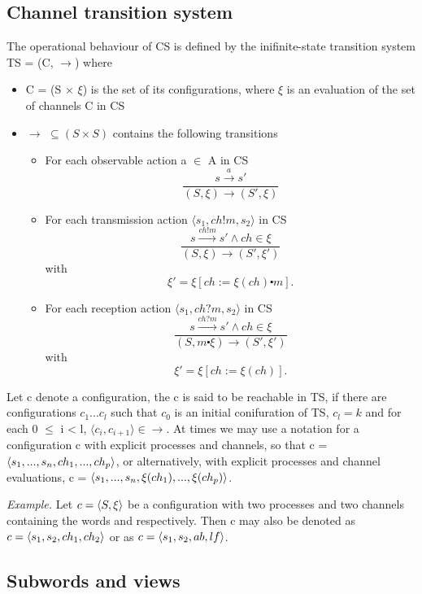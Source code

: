 \subsection{Channel transition system}
The operational behaviour of CS is defined by the inifinite-state transition system TS = (C, $\rightarrow$) where
\begin{itemize}
\item[]
   C = (S $\times$ $\xi$) is the set of its configurations, where $\xi$ is an evaluation of the set of channels C in CS
\item[]
  $\rightarrow$ $\subseteq (S \times S)$ contains the following transitions
  \begin{itemize}
    \item
      For each observable action a $\in$ A in CS
      \[
      \dfrac{s \xrightarrow{a} s'}{(S, \xi) \rightarrow (S', \xi)}
      \]
    \item
      For each transmission action $\langle s_1, ch!m, s_2 \rangle$ in CS
      \[
      \dfrac{s \xrightarrow{ch!m} s' \wedge ch \in \xi}{(S, \xi) \rightarrow (S', \xi')} \] with \[ \xi' = \xi[ch := \xi (ch) \centerdot m].
      \]
    \item
      For each reception action $\langle s_1, ch?m, s_2 \rangle$ in CS
      \[
      \dfrac{s \xrightarrow{ch?m} s' \wedge ch \in \xi}{(S, m \centerdot \xi) \rightarrow (S', \xi')} \] with \[ \xi' = \xi[ch:= \xi (ch)].
      \]

  \end{itemize}
\end{itemize}

Let c denote a configuration, the c is said to be reachable in TS, if there are configurations $c_1...c_l$ such that $c_0$ is an initial conifuration of TS, $c_l = k$ and for each 0 $\leq$ i < l, $\langle c_i, c_{i+1} \rangle \in \rightarrow$. At times we may use a notation for a configuration c with explicit processes and channels, so that c = $\langle s_1,...,s_n, ch_1,...,ch_p\rangle$, or alternatively, with explicit processes and channel evaluations, c = $\langle s_1,...,s_n, \xi(ch_1),...,\xi(ch_p)\rangle$.

\emph{Example.} Let $c = \langle S,\xi\rangle$ be a configuration with two processes and two channels containing the words  and  respectively. Then c may also be denoted as $c = \langle s_1,s_2, ch_1, ch_2\rangle$ or as $c = \langle s_1,s_2,ab,lf\rangle$. 

\newpage

\subsection{Subwords and views}

